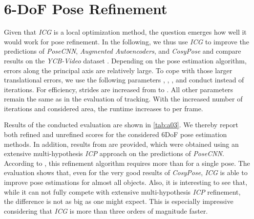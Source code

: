 \documentclass[10pt,twocolumn,letterpaper]{article}
\begin{document}
\section{6-DoF Pose Refinement}\label{sec:a4}
Given that \textit{ICG} is a local optimization method, the question emerges how well it would work for pose refinement.
In the following, we thus use \textit{ICG} to improve the predictions of \textit{PoseCNN}, \textit{Augmented Autoencoders}, and \textit{CosyPose} and compare results on the \textit{YCB-Video} dataset \cite{Xiang2018}.
Depending on the pose estimation algorithm, errors along the principal axis are relatively large.
To cope with those larger translational errors, we use the following parameters , , , and conduct  instead of  iterations.
For efficiency, strides are increased from  to .
All other parameters remain the same as in the evaluation of tracking.
With the increased number of iterations and considered area, the runtime increases to  per frame.

Results of the conducted evaluation are shown in \cref{tab:a03}.
We thereby report both refined and unrefined scores for the considered \acs{6DoF} pose estimation methods.
In addition, results from \cite{Xiang2018} are provided, which were obtained using an extensive multi-hypothesis \textit{ICP} approach on the predictions of \textit{PoseCNN}.
According to \cite{Wang2019b}, this refinement algorithm requires more than  for a single pose.
The evaluation shows that, even for the very good results of \textit{CosyPose}, \textit{ICG} is able to improve pose estimations for almost all objects.
Also, it is interesting to see that, while it can not fully compete with extensive multi-hypothesis \textit{ICP} refinement, the difference is not as big as one might expect.
This is especially impressive considering that \textit{ICG} is more than three orders of magnitude faster.
\end{document}
